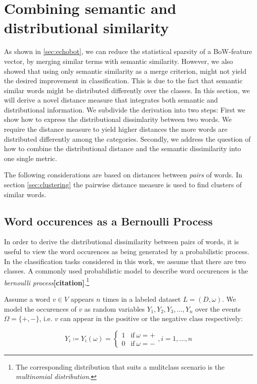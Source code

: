 \section{Combining semantic and distributional similarity}

As shown in \ref{sec:echobot}, we can reduce the statistical sparsity of a
BoW-feature vector, by merging similar terms with semantic similarity. However,
we also showed that using only semantic similarity as a merge criterion,
might not yield the desired improvement in classification. This is due to the
fact that semantic similar words might be distributed differently over the
classes. In this section, we will derive a novel distance measure that
integrates both semantic and distributional information. We subdivide the
derivation into two steps: 
First we show how to express the distributional dissimlarity between two words.
We require the distance measure to yield higher distances the more words 
are distributed differently among the categories. Secondly, we address the
question of how to combine the distributional distance and the semantic
dissimilarity into one single metric.

The following considerations are based on distances between \emph{pairs} of words. In
section \ref{sec:clustering} the pairwise distance measure is used to find 
clusters of similar words.

\subsection{Word occurences as a Bernoulli Process}
In order to derive the distributional dissimilarity between pairs of words, it
is useful to view the word occurences as being generated by a probabilistic
process. In the classification tasks considered in this work, we assume that
there are two classes. A commonly used probabilistic model to describe word
occurences is the \emph{bernoulli process}\textbf{[citation]}.\footnote{The 
corresponding distribution that suits a mulitclass scenario is the \emph{multinomial
distribution}.} 

Assume a word $v \in V$ appears $n$ times in a labeled dataset $L=(D,\omega)$.
We model the occurences of $v$ as random variables $Y_1, Y_2, Y_3, \ldots, Y_n$ over the events $\Omega = \{ +, -\}$, 
i.e. $v$ can appear in the positive or the negative class respectively:

\begin{equation*}
	Y_i \coloneqq Y_i(\omega) = \begin{cases} 1 & \mathrm{if~} \omega = \mathrm{+}
	\\
	0 & \mathrm{if~} \omega = \mathrm{-} \end{cases}, i = 1,\ldots,n
\end{equation*}

